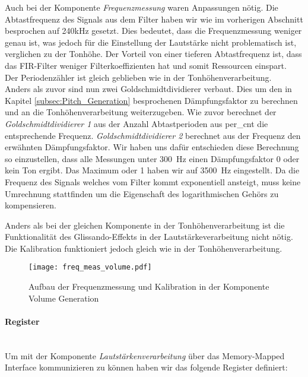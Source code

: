 Auch bei der Komponente \textit{Frequenzmessung} waren Anpassungen nötig. 
Die Abtastfrequenz des Signals aus dem Filter haben wir wie im vorherigen Abschnitt besprochen auf 240kHz gesetzt. Dies bedeutet, dass die Frequenzmessung weniger genau ist, was jedoch für die Einstellung der Lautstärke nicht problematisch ist, verglichen zu der Tonhöhe. Der Vorteil von einer tieferen Abtastfrequenz ist, dass das FIR-Filter weniger Filterkoeffizienten hat und somit Ressourcen einspart.\\
Der Periodenzähler ist gleich geblieben wie in der Tonhöhenverarbeitung.\\
Anders als zuvor sind nun zwei Goldschmidtdividierer verbaut. Dies um den in Kapitel \ref{subsec:Pitch_Generation} besprochenen Dämpfungsfaktor zu berechnen und an die Tonhöhenverarbeitung weiterzugeben. Wie zuvor berechnet der \textit{Goldschmidtdividierer 1} aus der Anzahl Abtastperioden aus per\_cnt die entsprechende Frequenz. \textit{Goldschmidtdividierer 2} berechnet aus der Frequenz den erwähnten Dämpfungsfaktor. Wir haben uns dafür entschieden diese Berechnung so einzustellen, dass alle Messungen unter \SI{300}{Hz} einen Dämpfungsfaktor 0 oder kein Ton ergibt. Das Maximum oder 1 haben wir auf \SI{3500}{Hz} eingestellt. Da die Frequenz des Signals welches vom Filter kommt exponentiell ansteigt, muss keine Umrechnung stattfinden um die Eigenschaft des logarithmischen Gehörs zu kompensieren.

Anders als bei der gleichen Komponente in der Tonhöhenverarbeitung ist die Funktionalität des Glissando-Effekts in der Lautstärkeverarbeitung nicht nötig. Die Kalibration funktioniert jedoch gleich wie in der Tonhöhenverarbeitung.

\begin{figure}[h!]
	\centering
	\texttt{[image: freq\_meas\_volume.pdf]}
	\caption{Aufbau der Frequenzmessung und Kalibration in der Komponente Volume Generation} 
	\label{img:freq_meas_volume}
\end{figure}  

\newpage

\paragraph{Register}\mbox{}\\
Um mit der Komponente \textit{Lautstärkenverarbeitung} über das Memory-Mapped Interface kommunizieren zu können haben wir das folgende Register definiert:


